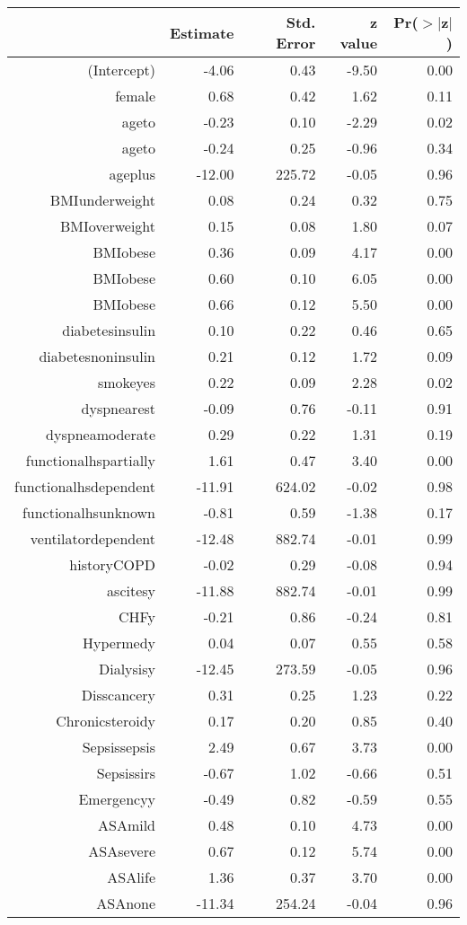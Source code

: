 \bigskip\bigskip
\centering
\begin{tabular}{rrrrr}
  \hline
 & Estimate & Std. Error & z value & Pr($>$$|$z$|$) \\ 
  \hline
(Intercept) & -4.06 & 0.43 & -9.50 & 0.00 \\ 
  female & 0.68 & 0.42 & 1.62 & 0.11 \\ 
  age\-65\-to\-74 & -0.23 & 0.10 & -2.29 & 0.02 \\ 
  age\-75\-to\-84 & -0.24 & 0.25 & -0.96 & 0.34 \\ 
  age\-85\-plus & -12.00 & 225.72 & -0.05 & 0.96 \\ 
  BMI\-underweight & 0.08 & 0.24 & 0.32 & 0.75 \\ 
  BMI\-overweight & 0.15 & 0.08 & 1.80 & 0.07 \\ 
  BMI\-obese\-1 & 0.36 & 0.09 & 4.17 & 0.00 \\ 
  BMI\-obese\-2 & 0.60 & 0.10 & 6.05 & 0.00 \\ 
  BMI\-obese\-3 & 0.66 & 0.12 & 5.50 & 0.00 \\ 
  diabetes\-insulin & 0.10 & 0.22 & 0.46 & 0.65 \\ 
  diabetes\-noninsulin & 0.21 & 0.12 & 1.72 & 0.09 \\ 
  smoke\-yes & 0.22 & 0.09 & 2.28 & 0.02 \\ 
  dyspnea\-rest & -0.09 & 0.76 & -0.11 & 0.91 \\ 
  dyspnea\-moderate & 0.29 & 0.22 & 1.31 & 0.19 \\ 
  functional\-hs\-partially & 1.61 & 0.47 & 3.40 & 0.00 \\ 
  functional\-hs\-dependent & -11.91 & 624.02 & -0.02 & 0.98 \\ 
  functional\-hs\-unknown & -0.81 & 0.59 & -1.38 & 0.17 \\ 
  ventilator\-dependent & -12.48 & 882.74 & -0.01 & 0.99 \\ 
  history\-COPD & -0.02 & 0.29 & -0.08 & 0.94 \\ 
  ascites\-y & -11.88 & 882.74 & -0.01 & 0.99 \\ 
  CHF\-y & -0.21 & 0.86 & -0.24 & 0.81 \\ 
  Hyper\-med\-y & 0.04 & 0.07 & 0.55 & 0.58 \\ 
  Dialysis\-y & -12.45 & 273.59 & -0.05 & 0.96 \\ 
  Diss\-cancer\-y & 0.31 & 0.25 & 1.23 & 0.22 \\ 
  Chronic\-steroid\-y & 0.17 & 0.20 & 0.85 & 0.40 \\ 
  Sepsis\-sepsis & 2.49 & 0.67 & 3.73 & 0.00 \\ 
  Sepsis\-sirs & -0.67 & 1.02 & -0.66 & 0.51 \\ 
  Emergency\-y & -0.49 & 0.82 & -0.59 & 0.55 \\ 
  ASA\-mild & 0.48 & 0.10 & 4.73 & 0.00 \\ 
  ASA\-severe & 0.67 & 0.12 & 5.74 & 0.00 \\ 
  ASA\-life & 1.36 & 0.37 & 3.70 & 0.00 \\ 
  ASA\-none & -11.34 & 254.24 & -0.04 & 0.96 \\ 
   \hline
\end{tabular}
